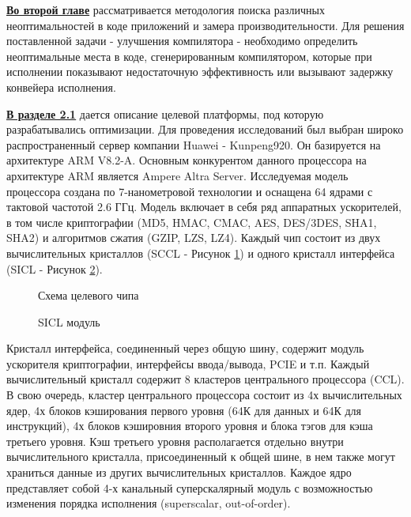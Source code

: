 \underline{\textbf{Во второй главе}} рассматривается методология поиска различных неоптимальностей в коде приложений и замера производительности. Для решения поставленной задачи - улучшения
компилятора - необходимо определить неоптимальные места в коде, сгенерированным компилятором, которые при исполнении показывают недостаточную эффективность или вызывают задержку конвейера исполнения.

\underline{\textbf{В разделе 2.1}}
дается описание целевой платформы, под которую разрабатывались
оптимизации. Для проведения исследований был выбран широко распространенный сервер компании Huawei - Kunpeng920. Он базируется на архитектуре ARM V8.2-A.  Основным конкурентом данного процессора на архитектуре ARM является Ampere Altra Server.  Исследуемая модель процессора создана по 7-нанометровой технологии и оснащена 64 ядрами с тактовой частотой 2.6 ГГц. Модель включает в себя  ряд аппаратных ускорителей, в том числе криптографии (MD5, HMAC, CMAC, AES, DES/3DES,  SHA1, SHA2) и  алгоритмов сжатия (GZIP, LZS, LZ4). 
Каждый чип состоит из двух вычислительных кристаллов (SCCL - Рисунок
\ref{chip1}) и одного кристалл интерфейса (SICL - Рисунок \ref{chip2}).

\begin{figure}[htbp]
	\centering
	
	\caption{Схема целевого чипа}
	\label{chip1}
\end{figure}
\begin{figure}[htbp]
	\centering
	
	\caption{SICL модуль}
	\label{chip2}
\end{figure}



Кристалл
интерфейса, соединенный через общую шину, содержит модуль ускорителя
криптографии, интерфейсы ввода/вывода, PCIE и т.п. Каждый вычислительный
кристалл содержит 8 кластеров центрального процессора (CCL). В свою
очередь, кластер центрального процессора состоит из 4х вычислительных ядер,
4х блоков кэширования первого уровня (64К для данных и 64К для инструкций),
4х блоков кэшировния второго уровня и блока тэгов для кэша третьего
уровня. Кэш третьего уровня располагается отдельно внутри вычислительного
кристалла, присоединенный к общей шине, в нем также могут храниться данные
из других вычислительных кристаллов. Каждое ядро представляет собой
4-х канальный суперскалярный модуль с возможностью изменения порядка
исполнения (superscalar, out-of-order).



